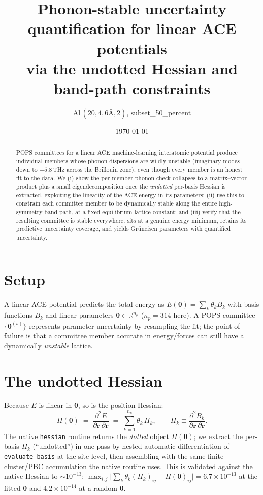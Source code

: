 \documentclass[11pt]{article}
\title{\textbf{Phonon-stable uncertainty quantification for linear ACE potentials\\ via the undotted Hessian and band-path constraints}}
\author{Al\,$(20,4,6\text{\AA},2)$, subset\_50\_percent}
\date{\today}
\newcommand{\R}{\mathbb{R}}
\newcommand{\bt}{\boldsymbol{\theta}}
\begin{document}
\maketitle

\begin{abstract}
POPS committees for a linear ACE machine-learning interatomic potential produce
individual members whose phonon dispersions are wildly unstable (imaginary modes
down to $-5.8$\,THz across the Brillouin zone), even though every member is an
honest fit to the data. We (i) show the per-member phonon check collapses to a
matrix--vector product plus a small eigendecomposition once the \emph{undotted}
per-basis Hessian is extracted, exploiting the linearity of the ACE energy in
its parameters; (ii) use this to constrain each committee member to be
dynamically stable along the entire high-symmetry band path, at a fixed
equilibrium lattice constant; and (iii) verify that the resulting committee is
stable everywhere, sits at a genuine energy minimum, retains its predictive
uncertainty coverage, and yields Gr\"uneisen parameters with quantified
uncertainty.
\end{abstract}

\section{Setup}
A linear ACE potential predicts the total energy as $E(\bt) = \sum_k \theta_k B_k$
with basis functions $B_k$ and linear parameters $\bt \in \R^{n_p}$
($n_p=314$ here). A POPS committee $\{\bt^{(s)}\}$ represents parameter
uncertainty by resampling the fit; the point of failure is that a committee
member accurate in energy/forces can still have a dynamically \emph{unstable}
lattice.

\section{The undotted Hessian}
Because $E$ is linear in $\bt$, so is the position Hessian:
\begin{equation}
  H(\bt) \;=\; \frac{\partial^2 E}{\partial \mathbf r\,\partial \mathbf r}
  \;=\; \sum_{k=1}^{n_p} \theta_k\, H_k,
  \qquad H_k \equiv \frac{\partial^2 B_k}{\partial \mathbf r\,\partial \mathbf r}.
\end{equation}
The native \texttt{hessian} routine returns the \emph{dotted} object $H(\bt)$;
we extract the per-basis $H_k$ (``undotted'') in one pass by nested
automatic differentiation of \texttt{evaluate\_basis} at the site level, then
assembling with the same finite-cluster/PBC accumulation the native routine
uses. This is validated against the native Hessian to $\sim\!10^{-13}$:
$\max_{i,j}\big|\sum_k \theta_k (H_k)_{ij} - H(\bt)_{ij}\big| = 6.7\times10^{-13}$
at the fitted $\bt$ and $4.2\times10^{-14}$ at a random $\bt$.
\end{document}
